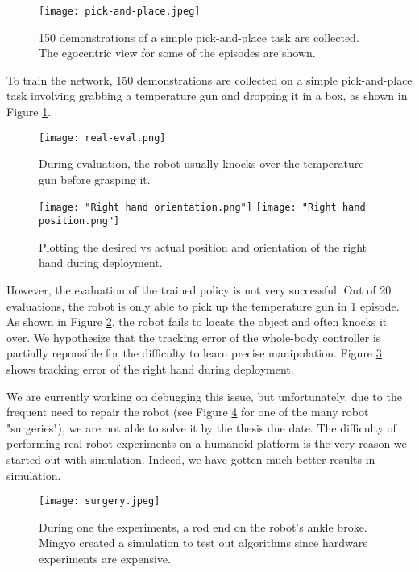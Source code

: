 \begin{figure}
	\centering
	\texttt{[image: pick-and-place.jpeg]}
    \caption{150 demonstrations of a simple pick-and-place task are collected. The egocentric view for some of the episodes are shown. }
    \label{fig:pick-and-place}
\end{figure}

To train the network, 150 demonstrations are collected on a simple pick-and-place task involving grabbing a temperature gun and dropping it in a box, as shown in Figure \ref{fig:pick-and-place}.

\begin{figure}
	\centering
	\texttt{[image: real-eval.png]}
    \caption{During evaluation, the robot usually knocks over the temperature gun before grasping it.}
    \label{fig:real-eval}
\end{figure}
\begin{figure}
	\centering
	\texttt{[image: "Right hand orientation.png"]}
	\texttt{[image: "Right hand position.png"]}
    \caption{Plotting the desired vs actual position and orientation of the right hand during deployment. }
    \label{fig:tracking-plot}
\end{figure}


However, the evaluation of the trained policy is not very successful. Out of 20 evaluations, the robot is only able to pick up the temperature gun in 1 episode. As shown in Figure \ref{fig:real-eval}, the robot fails to locate the object and often knocks it over. 
We hypothesize that the tracking error of the whole-body controller is partially reponsible for the difficulty to learn precise manipulation. Figure \ref{fig:tracking-plot} shows tracking error of the right hand during deployment.


We are currently working on debugging this issue, but unfortunately, due to the frequent need to repair the robot (see Figure \ref{fig:surgery} for one of the many robot "surgeries"), we are not able to solve it by the thesis due date. The difficulty of performing real-robot experiments on a humanoid platform is the very reason we started out with simulation. Indeed, we have gotten much better results in simulation.

\begin{figure}
	\centering
	\texttt{[image: surgery.jpeg]}
    \caption{During one the experiments, a rod end on the robot's ankle broke. Mingyo created a simulation to test out algorithms since hardware experiments are expensive. }
    \label{fig:surgery}
\end{figure}
